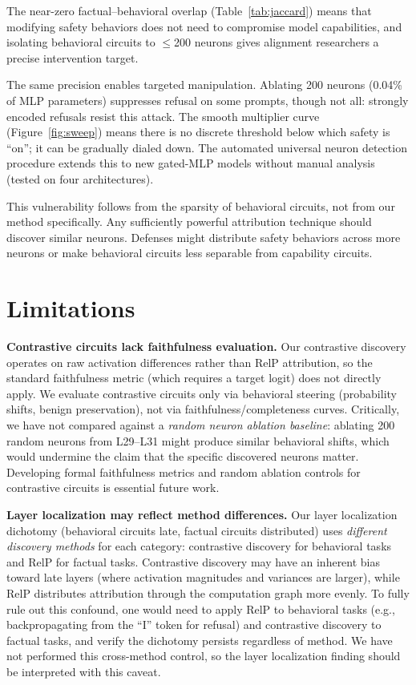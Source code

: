 \documentclass[11pt]{article}
\begin{document}
The near-zero factual--behavioral overlap (Table~\ref{tab:jaccard}) means that modifying safety behaviors does not need to compromise model capabilities, and isolating behavioral circuits to $\leq$200 neurons gives alignment researchers a precise intervention target.

The same precision enables targeted manipulation.
Ablating 200 neurons (0.04\% of MLP parameters) suppresses refusal on some prompts, though not all: strongly encoded refusals resist this attack.
The smooth multiplier curve (Figure~\ref{fig:sweep}) means there is no discrete threshold below which safety is ``on''; it can be gradually dialed down.
The automated universal neuron detection procedure extends this to new gated-MLP models without manual analysis (tested on four architectures).

This vulnerability follows from the sparsity of behavioral circuits, not from our method specifically.
Any sufficiently powerful attribution technique should discover similar neurons.
Defenses might distribute safety behaviors across more neurons or make behavioral circuits less separable from capability circuits.


\section{Limitations}
\label{sec:limitations}

\textbf{Contrastive circuits lack faithfulness evaluation.}
Our contrastive discovery operates on raw activation differences rather than RelP attribution, so the standard faithfulness metric (which requires a target logit) does not directly apply.
We evaluate contrastive circuits only via behavioral steering (probability shifts, benign preservation), not via faithfulness/completeness curves.
Critically, we have not compared against a \emph{random neuron ablation baseline}: ablating 200 random neurons from L29--L31 might produce similar behavioral shifts, which would undermine the claim that the specific discovered neurons matter.
Developing formal faithfulness metrics and random ablation controls for contrastive circuits is essential future work.

\textbf{Layer localization may reflect method differences.}
Our layer localization dichotomy (behavioral circuits late, factual circuits distributed) uses \emph{different discovery methods} for each category: contrastive discovery for behavioral tasks and RelP for factual tasks.
Contrastive discovery may have an inherent bias toward late layers (where activation magnitudes and variances are larger), while RelP distributes attribution through the computation graph more evenly.
To fully rule out this confound, one would need to apply RelP to behavioral tasks (e.g., backpropagating from the ``I'' token for refusal) and contrastive discovery to factual tasks, and verify the dichotomy persists regardless of method.
We have not performed this cross-method control, so the layer localization finding should be interpreted with this caveat.
\end{document}
